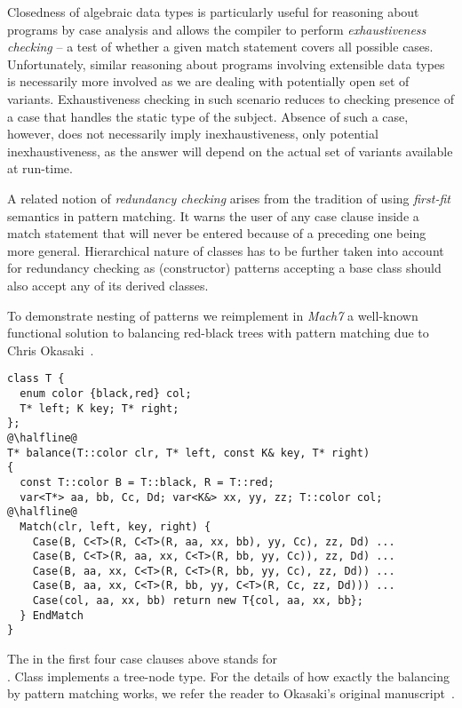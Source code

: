 Closedness of algebraic data types is particularly useful for reasoning about 
programs by case analysis and allows the compiler to perform \emph{exhaustiveness 
checking} -- a test of whether a given match statement covers all possible 
cases. Unfortunately, similar reasoning about programs involving extensible data 
types is necessarily more involved as we are dealing with potentially open set of variants. 
Exhaustiveness checking in such scenario reduces to checking presence of a case 
that handles the static type of the subject. Absence of such a case, however, 
does not necessarily imply inexhaustiveness, only potential inexhaustiveness, 
as the answer will depend on the actual set of variants available at run-time. 

A related notion of \emph{redundancy checking} arises from the tradition of 
using \emph{first-fit} semantics in pattern matching. It warns the user of any 
case clause inside a match statement that will never be entered because of a 
preceding one being more general. Hierarchical nature of classes has to be 
further taken into account for redundancy checking as (constructor) patterns 
accepting a base class should also accept any of its derived classes.

To demonstrate nesting of patterns we reimplement in \emph{Mach7} a well-known 
functional solution to balancing red-black trees with pattern matching due to 
Chris Okasaki~\cite[]{okasaki1999purely}.

\begin{lstlisting}[keepspaces]
class T { 
  enum color {black,red} col; 
  T* left; K key; T* right; 
};
@\halfline@
T* balance(T::color clr, T* left, const K& key, T* right)
{
  const T::color B = T::black, R = T::red;
  var<T*> aa, bb, Cc, Dd; var<K&> xx, yy, zz; T::color col;
@\halfline@
  Match(clr, left, key, right) {
    Case(B, C<T>(R, C<T>(R, aa, xx, bb), yy, Cc), zz, Dd) ...
    Case(B, C<T>(R, aa, xx, C<T>(R, bb, yy, Cc)), zz, Dd) ...
    Case(B, aa, xx, C<T>(R, C<T>(R, bb, yy, Cc), zz, Dd)) ...
    Case(B, aa, xx, C<T>(R, bb, yy, C<T>(R, Cc, zz, Dd))) ...
    Case(col, aa, xx, bb) return new T{col, aa, xx, bb};
  } EndMatch
}
\end{lstlisting}

\noindent
The  in the first four case clauses above stands for \\ %
. Class 
 implements a tree-node type. For the details of how exactly the 
balancing by pattern matching works, we refer the reader to Okasaki's original 
manuscript~\cite[]{okasaki1999purely}.

